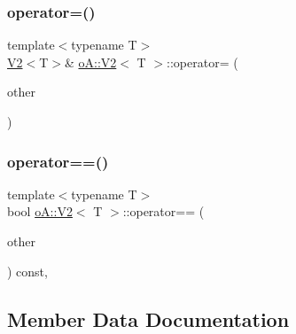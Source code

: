 \mbox{\label{structo_a_1_1_v2_a144fb5845961c65ae8d6417ecca9e395}} 
\subsubsection{\texorpdfstring{operator=()}{operator=()}\hspace{0.1cm}{\footnotesize\ttfamily [2/2]}}
{\footnotesize\ttfamily template$<$typename T$>$ \\
\mbox{\hyperlink{structo_a_1_1_v2}{V2}}$<$T$>$\& \mbox{\hyperlink{structo_a_1_1_v2}{o\+A\+::\+V2}}$<$ T $>$\+::operator= (\begin{DoxyParamCaption}\item[{const \mbox{\hyperlink{structo_a_1_1_v2}{o\+A\+::\+V2}}$<$ T $>$ \&}]{other }\end{DoxyParamCaption})\hspace{0.3cm}{\ttfamily [inline]}}

\mbox{\label{structo_a_1_1_v2_a7f3c992b4271b76c704b30a42801facb}} 
\subsubsection{\texorpdfstring{operator==()}{operator==()}}
{\footnotesize\ttfamily template$<$typename T$>$ \\
bool \mbox{\hyperlink{structo_a_1_1_v2}{o\+A\+::\+V2}}$<$ T $>$\+::operator== (\begin{DoxyParamCaption}\item[{const \mbox{\hyperlink{structo_a_1_1_v2}{o\+A\+::\+V2}}$<$ T $>$ \&}]{other }\end{DoxyParamCaption}) const\hspace{0.3cm}{\ttfamily [inline]}, {\ttfamily [noexcept]}}



\subsection{Member Data Documentation}
\mbox{\label{structo_a_1_1_v2_ac1fdde8edfc1fdf4181450eb85795088}} 
